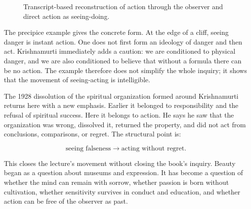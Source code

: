 \documentclass[11pt,oneside]{book}
\begin{document}
\begin{figure}
\centering
{}

Transcript-based reconstruction of action through the observer and direct action as seeing-doing.
\end{figure}

The precipice example gives the concrete form. At the edge of a cliff, seeing danger is instant action. One does not first form an ideology of danger and then act. Krishnamurti immediately adds a caution: we are conditioned to physical danger, and we are also conditioned to believe that without a formula there can be no action. The example therefore does not simplify the whole inquiry; it shows that the movement of seeing-acting is intelligible.

The 1928 dissolution of the spiritual organization formed around Krishnamurti returns here with a new emphasis. Earlier it belonged to responsibility and the refusal of spiritual success. Here it belongs to action. He says he saw that the organization was wrong, dissolved it, returned the property, and did not act from conclusions, comparisons, or regret. The structural point is:

\begin{equation}
\text{seeing falseness}
\longrightarrow
\text{acting without regret}.
\end{equation}

This closes the lecture's movement without closing the book's inquiry. Beauty began as a question about museums and expression. It has become a question of whether the mind can remain with sorrow, whether passion is born without cultivation, whether sensitivity survives in conduct and education, and whether action can be free of the observer as past.
\end{document}
